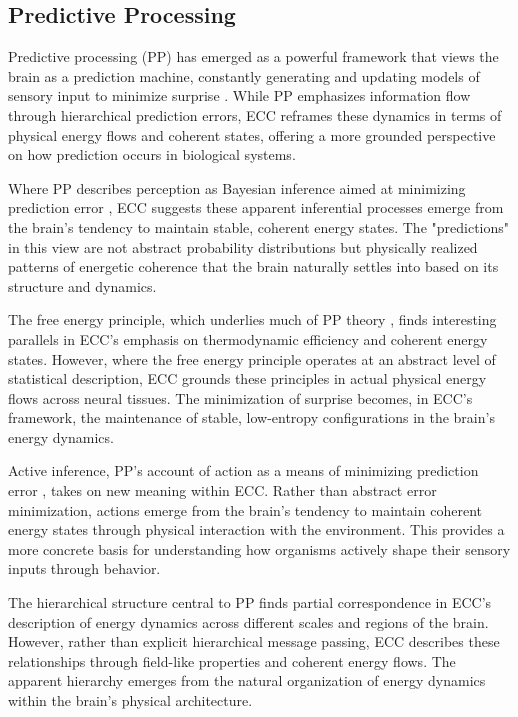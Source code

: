 \begin{refsection}
\section{Predictive Processing}

Predictive processing (PP) has emerged as a powerful framework that views the brain as a prediction machine, constantly generating and updating models of sensory input to minimize surprise \cite{Clark2013}. While PP emphasizes information flow through hierarchical prediction errors, ECC reframes these dynamics in terms of physical energy flows and coherent states, offering a more grounded perspective on how prediction occurs in biological systems.

Where PP describes perception as Bayesian inference aimed at minimizing prediction error \cite{Friston2010}, ECC suggests these apparent inferential processes emerge from the brain's tendency to maintain stable, coherent energy states. The "predictions" in this view are not abstract probability distributions but physically realized patterns of energetic coherence that the brain naturally settles into based on its structure and dynamics.

The free energy principle, which underlies much of PP theory \cite{Friston2009}, finds interesting parallels in ECC's emphasis on thermodynamic efficiency and coherent energy states. However, where the free energy principle operates at an abstract level of statistical description, ECC grounds these principles in actual physical energy flows across neural tissues. The minimization of surprise becomes, in ECC's framework, the maintenance of stable, low-entropy configurations in the brain's energy dynamics.

Active inference, PP's account of action as a means of minimizing prediction error \cite{Clark2016}, takes on new meaning within ECC. Rather than abstract error minimization, actions emerge from the brain's tendency to maintain coherent energy states through physical interaction with the environment. This provides a more concrete basis for understanding how organisms actively shape their sensory inputs through behavior.

The hierarchical structure central to PP \cite{Hohwy2013} finds partial correspondence in ECC's description of energy dynamics across different scales and regions of the brain. However, rather than explicit hierarchical message passing, ECC describes these relationships through field-like properties and coherent energy flows. The apparent hierarchy emerges from the natural organization of energy dynamics within the brain's physical architecture.


\end{refsection}
